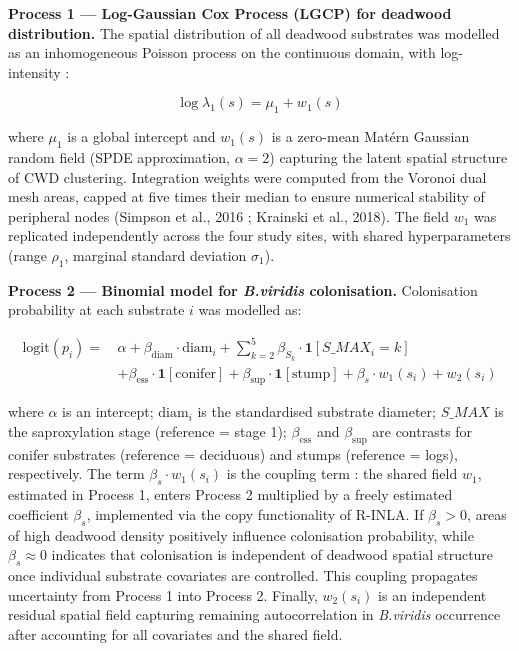 \documentclass[
  letterpaper,
  DIV=11,
  numbers=noendperiod]{scrartcl}
\begin{document}
\textbf{Process 1 --- Log-Gaussian Cox Process (LGCP) for deadwood
distribution.} The spatial distribution of all deadwood substrates was
modelled as an inhomogeneous Poisson process on the continuous domain,
with log-intensity :

\[\log \lambda_1(s) = \mu_1 + w_1(s)\]

where \(\mu_1\) is a global intercept and \(w_1(s)\) is a zero-mean
Matérn Gaussian random field (SPDE approximation, \(\alpha = 2\))
capturing the latent spatial structure of CWD clustering. Integration
weights were computed from the Voronoi dual mesh areas, capped at five
times their median to ensure numerical stability of peripheral nodes
(Simpson et al., 2016 ; Krainski et al., 2018). The field \(w_1\) was
replicated independently across the four study sites, with shared
hyperparameters (range \(\rho_1\), marginal standard deviation
\(\sigma_1\)).

\textbf{Process 2 --- Binomial model for \emph{B.viridis} colonisation.}
Colonisation probability at each substrate \(i\) was modelled as:

\[
\begin{aligned}
\text{logit}(p_i) = \, & \alpha + \beta_{\text{diam}} \cdot \text{diam}_i 
+ \sum_{k=2}^{5} \beta_{S_k} \cdot \mathbf{1}[S\_MAX_i = k] \\
& + \beta_{\text{ess}} \cdot \mathbf{1}[\text{conifer}] 
+ \beta_{\text{sup}} \cdot \mathbf{1}[\text{stump}] 
+ \beta_s \cdot w_1(s_i) + w_2(s_i)
\end{aligned}
\]

where \(\alpha\) is an intercept; \(\text{diam}_i\) is the standardised
substrate diameter; \(S\_MAX\) is the saproxylation stage (reference =
stage 1); \(\beta_{\text{ess}}\) and \(\beta_{\text{sup}}\) are
contrasts for conifer substrates (reference = deciduous) and stumps
(reference = logs), respectively. The term \(\beta_s \cdot w_1(s_i)\) is
the coupling term : the shared field \(w_1\), estimated in Process 1,
enters Process 2 multiplied by a freely estimated coefficient
\(\beta_s\), implemented via the copy functionality of R-INLA. If
\(\beta_s > 0\), areas of high deadwood density positively influence
colonisation probability, while \(\beta_s \approx 0\) indicates that
colonisation is independent of deadwood spatial structure once
individual substrate covariates are controlled. This coupling propagates
uncertainty from Process 1 into Process 2. Finally, \(w_2(s_i)\) is an
independent residual spatial field capturing remaining autocorrelation
in \emph{B.viridis} occurrence after accounting for all covariates and
the shared field.
\end{document}
